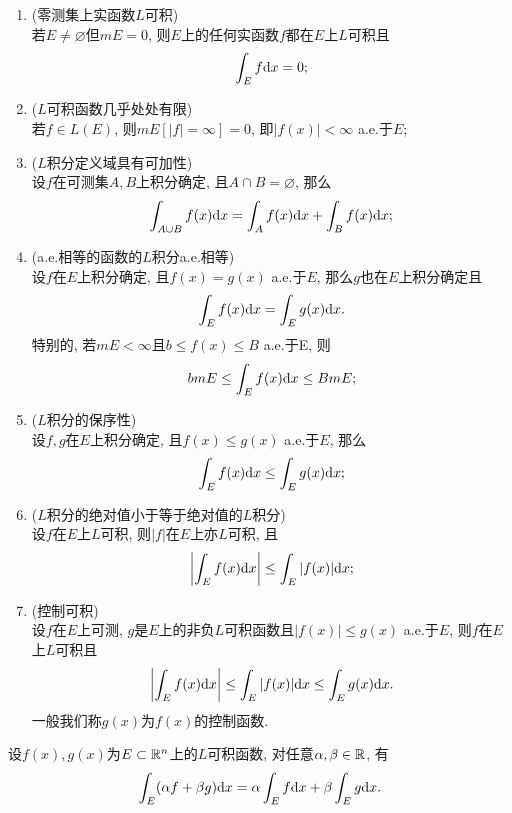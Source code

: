 \begin{theorem}[$L$积分的一些基本性质]
	\begin{enumerate}
		\item (零测集上实函数$L$可积) \\
		\quad  若$E \neq \varnothing$但$mE=0$, 则$E$上的任何实函数$f$都在$E$上$L$可积且
			$$
				\int_E f \mathrm{d} x = 0;
			$$
		\vskip 0.2cm
		\item ($L$可积函数几乎处处有限) \\
		\quad  若$f \in L(E)$, 则$m E[|f| = \infty] = 0$, 即$|f(x)| < \infty$ a.e.于$E$; 
		\vskip 0.2cm
		\item ($L$积分定义域具有可加性) \\
		\quad 设$f$在可测集$A,B$上积分确定, 且$A \cap B = \varnothing$, 那么
		$$
			\int_{A \cup B} f(x) \mathrm{d} x = \int_{A} f(x) \mathrm{d} x+\int_{B} f(x) \mathrm{d} x ;
		$$
		\vskip 0.2cm
		\item (a.e.相等的函数的$L$积分a.e.相等) \\
		\quad 设$f$在$E$上积分确定, 且$f(x)=g(x)$ a.e.于$E$, 那么$g$也在$E$上积分确定且
		$$
			\int_{E} f(x) \mathrm{d} x = \int_{E} g(x) \mathrm{d} x .
		$$
		特别的, 若$mE < \infty$且$b \leq f(x) \leq B$ a.e.于E, 则
		$$
			bmE \leq \int_E f(x) \mathrm{d} x \leq BmE;
		$$
		\vskip 0.2cm
		\item ($L$积分的保序性) \\
		\quad 设$f, g$在$E$上积分确定, 且$f(x) \leq g(x)$ a.e.于$E$, 那么
		$$
			\int_{E} f(x) \mathrm{d} x \leq \int_{E} g(x) \mathrm{d} x ;
		$$
		\vskip 0.2cm
		\item ($L$积分的绝对值小于等于绝对值的$L$积分)\\
		\quad 设$f$在$E$上$L$可积, 则$|f|$在$E$上亦$L$可积, 且
		$$
			\left|\int_{E} f(x) \mathrm{d} x \right| \leq \int_{E} |f(x)| \mathrm{d} x ;
		$$
		\vskip 0.2cm
		\item (控制可积) \\
		\quad 设$f$在$E$上可测, $g$是$E$上的非负$L$可积函数且$|f(x)| \leq g(x)$ a.e.于$E$, 则$f$在$E$上$L$可积且
		$$
			\left|\int_{E} f(x) \mathrm{d} x \right| \leq \int_{E} |f(x)| \mathrm{d} x \leq \int_{E} g(x) \mathrm{d} x. 
		$$
		一般我们称$g(x)$为$f(x)$的控制函数. 
	\end{enumerate}
\end{theorem}

\vskip 0.2cm
\begin{theorem}[$L$积分的线性性]
	设$f(x),g(x)$为$E \subset \mathbb{R}^n$上的$L$可积函数, 
	对任意$\alpha,\beta \in \mathbb{R}$, 有
	\begin{equation}
		 \int_E (\alpha f + \beta g) \mathrm{d} x = \alpha \int_E f \mathrm{d} x + \beta \int_E g \mathrm{d} x.
	\end{equation}
\end{theorem}

